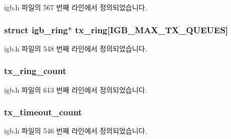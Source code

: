 igb.\+h 파일의 567 번째 라인에서 정의되었습니다.

\subsubsection[{\texorpdfstring{tx\+\_\+ring}{tx_ring}}]{\setlength{\rightskip}{0pt plus 5cm}struct {\bf igb\+\_\+ring}$\ast$ {\bf tx\+\_\+ring}\mbox{[}{\bf I\+G\+B\+\_\+\+M\+A\+X\+\_\+\+T\+X\+\_\+\+Q\+U\+E\+U\+ES}\mbox{]}}\hypertarget{structigb__adapter_ae1c0ae9a78e113fa4a71c227dd155cd2}{}\label{structigb__adapter_ae1c0ae9a78e113fa4a71c227dd155cd2}


igb.\+h 파일의 548 번째 라인에서 정의되었습니다.

\subsubsection[{\texorpdfstring{tx\+\_\+ring\+\_\+count}{tx_ring_count}}]{ tx\+\_\+ring\+\_\+count}\hypertarget{structigb__adapter_ade2d7a11c2efc594d1b4c64ed24813bb}{}\label{structigb__adapter_ade2d7a11c2efc594d1b4c64ed24813bb}


igb.\+h 파일의 613 번째 라인에서 정의되었습니다.

\subsubsection[{\texorpdfstring{tx\+\_\+timeout\+\_\+count}{tx_timeout_count}}]{ tx\+\_\+timeout\+\_\+count}\hypertarget{structigb__adapter_a8b4aa773f6fd0df2ade5d5f231279c5f}{}\label{structigb__adapter_a8b4aa773f6fd0df2ade5d5f231279c5f}


igb.\+h 파일의 546 번째 라인에서 정의되었습니다.

